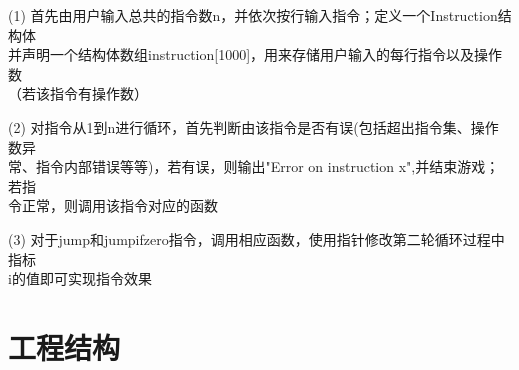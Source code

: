 \documentclass{report}
\begin{document}
    (1) 首先由用户输入总共的指令数n，并依次按行输入指令；定义一个Instruction结构体\\\hspace*{3.6em}并声明一个结构体数组instruction[1000]，用来存储用户输入的每行指令以及操作数\\\hspace*{3.6em}（若该指令有操作数）\vspace{0.3em}\par
    (2) 对指令从1到n进行循环，首先判断由该指令是否有误(包括超出指令集、操作数异\\\hspace*{3.6em}常、指令内部错误等等)，若有误，则输出"Error on instruction x",并结束游戏；若指\\\hspace*{3.6em}令正常，则调用该指令对应的函数\vspace{0.3em}\par
    (3) 对于jump和jumpifzero指令，调用相应函数，使用指针修改第二轮循环过程中指标\\\hspace*{3.6em}i的值即可实现指令效果

    \chapter{工程结构}\label{chap-2}
\end{document}
